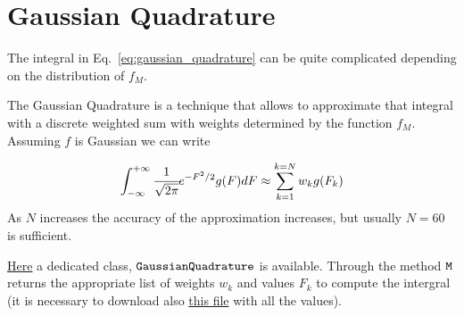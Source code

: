 \chapter{Gaussian Quadrature}\label{gaussian-quadrature}

The integral in Eq.~\ref{eq:gaussian_quadrature} can be quite
complicated depending on the distribution of \(f_M\).

The Gaussian Quadrature is a technique that allows to approximate that
integral with a discrete weighted sum with weights determined by the
function \(f_M\). Assuming \(f\) is Gaussian we can write

\begin{equation}\int_{-\infty}^{+\infty}\cfrac{1}{\sqrt{2\pi}}e^{-F^{2}/2}g(F)dF\approx\sum_{k=1}^{k=N}w_k g(F_k)\end{equation}
As \(N\) increases the accuracy of the approximation increases, but usually
\(N=60\) is sufficient.

\href{https://drive.google.com/file/d/1Ic20cgVx4dpDG4W_pIHR4EXq9ens1G-H/view?usp=sharing}{Here} a dedicated class, \(\tt{GaussianQuadrature}\) is
available. Through the method \(\tt{M}\) returns the appropriate list of
weights \(w_k\) and values \(F_k\) to compute the intergral (it is
necessary to download also \href{https://drive.google.com/file/d/1zpQ0ubbEzniJb9usMWeeMCc0DSc2MGsC/view?usp=sharing}{this file} with all the values).

